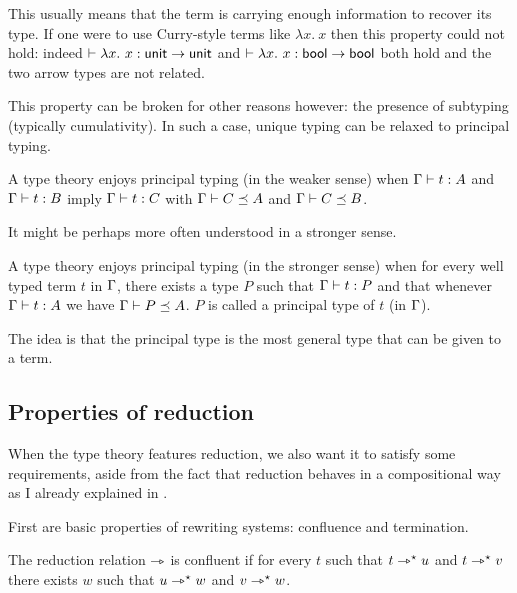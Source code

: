 This usually means that the term is carrying enough information to recover
its type. If one were to use Curry-style terms like
\(\lambda x.\ x\) then this property could not hold: indeed
\(\vdash \lambda x.\ x : \mathsf{unit} \to \mathsf{unit}\) and
\(\vdash \lambda x.\ x : \mathsf{bool} \to \mathsf{bool}\) both hold and the two arrow types
are not related.

This property can be broken for other reasons however: \eg the presence of
subtyping (typically cumulativity). In such a case, unique typing can be relaxed
to principal typing.

\begin{definition}
  A type theory enjoys principal typing (in the weaker sense) when
  \(\Gamma \vdash t : A\) and \(\Gamma \vdash t : B\) imply \(\Gamma \vdash t : C\) with
  \(\Gamma \vdash C \preceq A\) and \(\Gamma \vdash C \preceq B\).
\end{definition}

It might be perhaps more often understood in a stronger sense.

\begin{definition}
  A type theory enjoys principal typing (in the stronger sense) when for every
  well typed term \(t\) in \(\Gamma\), there exists a type \(P\) such that
  \(\Gamma \vdash t : P\) and that whenever \(\Gamma \vdash t : A\) we have
  \(\Gamma \vdash P \preceq A\).
  \(P\) is called a principal type of \(t\) (in \(\Gamma\)).
\end{definition}

The idea is that the principal type is the most general type that can be given
to a term.

\subsection{Properties of reduction}

When the type theory features reduction, we also want it to satisfy some
requirements, aside from the fact that reduction behaves in a compositional way
as I already explained in .

First are basic properties of rewriting systems: confluence and termination.

\begin{definition}[Confluence]
  The reduction relation \(\rightarrowtriangle\) is confluent if for every \(t\) such that
  \(t \rightarrowtriangle^{\star} u\) and \(t \rightarrowtriangle^{\star} v\) there exists \(w\) such that \(u \rightarrowtriangle^{\star} w\)
  and \(v \rightarrowtriangle^{\star} w\).
\end{definition}

